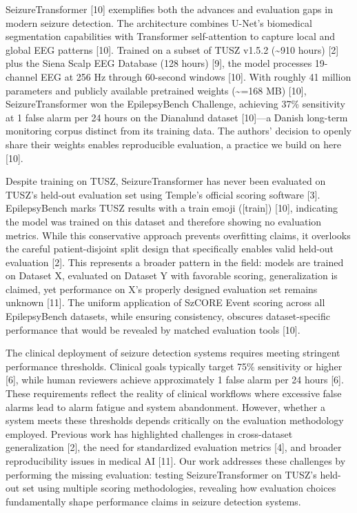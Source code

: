 \documentclass[
]{article}
\begin{document}
SeizureTransformer {[}10{]} exemplifies both the advances and evaluation
gaps in modern seizure detection. The architecture combines U-Net's
biomedical segmentation capabilities with Transformer self-attention to
capture local and global EEG patterns {[}10{]}. Trained on a subset of
TUSZ v1.5.2 (\textasciitilde910 hours) {[}2{]} plus the Siena Scalp EEG
Database (128 hours) {[}9{]}, the model processes 19-channel EEG at 256
Hz through 60-second windows {[}10{]}. With roughly 41 million
parameters and publicly available pretrained weights
(\textasciitilde=168 MB) {[}10{]}, SeizureTransformer won the
EpilepsyBench Challenge, achieving 37\% sensitivity at 1 false alarm per
24 hours on the Dianalund dataset {[}10{]}---a Danish long-term
monitoring corpus distinct from its training data. The authors' decision
to openly share their weights enables reproducible evaluation, a
practice we build on here {[}10{]}.

Despite training on TUSZ, SeizureTransformer has never been evaluated on
TUSZ's held-out evaluation set using Temple's official scoring software
{[}3{]}. EpilepsyBench marks TUSZ results with a train emoji
({[}train{]}) {[}10{]}, indicating the model was trained on this dataset
and therefore showing no evaluation metrics. While this conservative
approach prevents overfitting claims, it overlooks the careful
patient-disjoint split design that specifically enables valid held-out
evaluation {[}2{]}. This represents a broader pattern in the field:
models are trained on Dataset X, evaluated on Dataset Y with favorable
scoring, generalization is claimed, yet performance on X's properly
designed evaluation set remains unknown {[}11{]}. The uniform
application of SzCORE Event scoring across all EpilepsyBench datasets,
while ensuring consistency, obscures dataset-specific performance that
would be revealed by matched evaluation tools {[}10{]}.

The clinical deployment of seizure detection systems requires meeting
stringent performance thresholds. Clinical goals typically target 75\%
sensitivity or higher {[}6{]}, while human reviewers achieve
approximately 1 false alarm per 24 hours {[}6{]}. These requirements
reflect the reality of clinical workflows where excessive false alarms
lead to alarm fatigue and system abandonment. However, whether a system
meets these thresholds depends critically on the evaluation methodology
employed. Previous work has highlighted challenges in cross-dataset
generalization {[}2{]}, the need for standardized evaluation metrics
{[}4{]}, and broader reproducibility issues in medical AI {[}11{]}. Our
work addresses these challenges by performing the missing evaluation:
testing SeizureTransformer on TUSZ's held-out set using multiple scoring
methodologies, revealing how evaluation choices fundamentally shape
performance claims in seizure detection systems.
\end{document}
